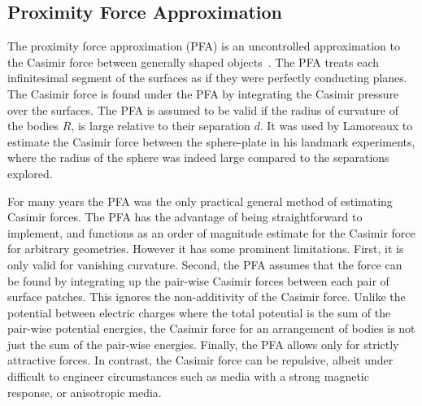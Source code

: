 \subsection{Proximity Force Approximation}

The proximity force approximation (PFA) is an uncontrolled approximation to
the Casimir force between generally shaped objects~\cite{Derjaguin1956}.  
The PFA treats each infinitesimal segment of the surfaces as if they were perfectly conducting planes.
The Casimir force is found under the PFA by integrating the Casimir pressure over the surfaces.
The PFA is assumed to be valid if the radius of curvature of the bodies $R$, is large relative to 
their separation $d$.  It was used by Lamoreaux to estimate the Casimir force between the sphere-plate
in his landmark experiments, where the radius of the sphere was indeed large compared to the separations explored. 

For many years the PFA was the only practical general method of estimating Casimir forces.
The PFA has the advantage of being straightforward to implement, and functions as an order of magnitude
estimate for the Casimir force for arbitrary geometries.
  However it has some prominent limitations.
  First, it is only valid for vanishing curvature.
 Second, the PFA assumes that the force can be found by integrating up
 the pair-wise Casimir forces between each pair of surface patches.  This ignores the non-additivity
of the Casimir force.  Unlike the potential between electric charges where the total potential is
the sum of the pair-wise potential energies, the Casimir force for an arrangement
of bodies is not just the sum of the pair-wise energies.  
Finally, the PFA allows only for strictly attractive forces.  
In contrast, the Casimir force can be repulsive, albeit under difficult to engineer circumstances 
such as media with a strong magnetic response, or anisotropic media.


